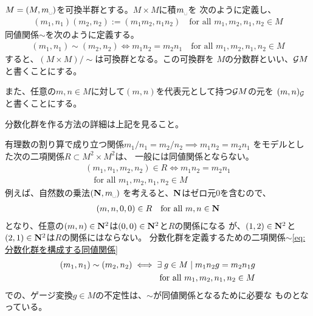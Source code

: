 	\begin{definition}[分数化群]\label{def:分数化群} %
		$M=(M,m_\myspace)$を可換半群とする。$M\times M$に積$m_\myspace$を
		次のように定義し、
		\begin{equation*}\begin{split}
			(m_1,n_1)(m_2,n_2) := (m_1m_2,n_1n_2)
			\quad\text{for all }m_1,m_2,n_1,n_2\in M
		\end{split}\end{equation*}
		同値関係$\sim$を次のように定義する。
		\begin{equation*}\begin{split}
			(m_1,n_1)\sim(m_2,n_2) \iff m_1n_2=m_2n_1
			\quad\text{for all }m_1,m_2,n_1,n_2\in M
		\end{split}\end{equation*}
		すると、$(M\times M)/\sim$は可換群となる。この可換群を
		$M$の分数群といい、${{\mathcal{G}}} M$と書くことにする。

		また、任意の$m,n\in M$に対して$(m,n)$を代表元として持つ${{\mathcal{G}}} M$の元を
		$(m,n)_{{\mathcal{G}}}$と書くことにする。

		分数化群を作る方法の詳細は上記を見ること。
	\end{definition} %

	\begin{note}[分数化群でのゲージ変換]\label{note:分数化群でのゲージ変換} %
		有理数の割り算で成り立つ関係$m_1/n_1=m_2/n_2\implies m_1n_2=m_2n_1$
		をモデルとした次の二項関係$R\subset M^2\times M^2$は、
		一般には同値関係とならない。
		\begin{equation*}\begin{split}
			(m_1,n_1,m_2,n_2)\in R \iff m_1n_2 = m_2n_1 \\
			\quad\text{for all }m_1,m_2,n_1,n_2\in M
		\end{split}\end{equation*}
		例えば、自然数の乗法$(\sizen,m_\myspace)$
		を考えると、$\mathbf{N}$はゼロ元$0$を含むので、
		\begin{equation*}\begin{split}
			(m,n,0,0)\in R \quad\text{for all }m,n\in \mathbf{N}
		\end{split}\end{equation*}
		となり、任意の$(m,n)\in\mathbf{N}^2$は$(0,0)\in\mathbf{N}^2$と$R$の関係になる
		が、$(1,2)\in\mathbf{N}^2$と$(2,1)\in\mathbf{N}^2$は$R$の関係にはならない。
		分数化群を定義するための二項関係$\sim$\eqref{eq:分数化群を構成する同値関係}
		\begin{equation*}\begin{split}
			(m_1,n_1) \sim (m_2,n_2)
			\iff \exists\; g\in M\;\vert\; m_1n_2g = m_2n_1g \\
			\quad\text{for all }m_1,m_2,n_1,n_2\in M
		\end{split}\end{equation*}
		での、ゲージ変換$g\in M$の不定性は、$\sim$が同値関係となるために必要な
		ものとなっている。
	\end{note} %

